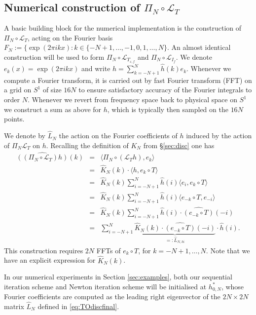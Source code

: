 \documentclass[12pt]{article}
\def\L{\mathcal{L}}
\newcommand{\eps}{\varepsilon}
\theoremstyle{plain}
\begin{document}
{{}



\subsection{Numerical construction of $\Pi_N\circ\L_{T}$}
\label{sec:numLT}
A basic building block for the numerical implementation is the construction of $\Pi_N\circ\L_{T}$, acting on the Fourier basis $F_N:=\{\exp(2\pi i k x): k\in\{-N +1,\ldots,-1,0,1,\ldots,N\}$.
An almost identical construction will be used to form $\Pi_N\circ\L_{T_{\eps,f}}$ and $\Pi_N\circ\L_{I_f}$.
We denote $e_k(x)=\exp(2\pi i k x)$ and write
 $h=\sum_{k=-N+1}^N \hat h(k) e_k$.
Whenever we compute a Fourier transform, it is carried out by fast Fourier transform (FFT) \cite{FFTW} on a grid on $S^1$ of size $16N$ to ensure satisfactory accuracy of the Fourier integrals to order $N$.
Whenever we revert from frequency space back to physical space on $S^1$ we construct a sum as above for $h$, which is typically then sampled on the $16N$ points.

We denote by $\hat L_N$ the action on the Fourier coefficients of $h$ induced by the action of $\Pi_N\L_{T}$ on $h$.
Recalling the definition of $K_N$ from \S\ref{sec:disc} one has
\begin{eqnarray}
\nonumber    \widehat{\left((\Pi_N\circ\L_{T})h\right)}(k) &=& \langle \Pi_N\circ(\L_{T}h), e_k\rangle \\
\nonumber     &=& \hat{K}_N(k)\cdot\langle h, e_k\circ T\rangle\\
  \nonumber   &=&\hat{K}_N(k)\sum_{i=-N+1}^{N} \hat h(i)\langle e_i, e_k\circ T\rangle\\
  \nonumber      &=&\hat{K}_N(k)\sum_{i=-N+1}^{N} \hat h(i)\langle e_{-k}\circ T, e_{-i}\rangle\\
\nonumber   &=&\hat{K}_N(k)\sum_{i=-N+1}^{N} \hat h(i)\cdot \widehat{(e_{-k}\circ T)}(-i)\\
\label{eq:TOdiscfinal}    &=&\sum_{i=-N+1}^{N} \underbrace{\hat{K}_N(k)\cdot \widehat{(e_{-k}\circ T)}(-i)}_{=:\hat L_{N,ki}}\cdot\hat h(i).
\end{eqnarray}
This construction requires $2N$ FFTs of $e_k\circ T$, for $k=-N+1,\ldots,N$.
Note that we have an explicit expression for $\hat{K}_N(k)$.

In our numerical experiments in Section \ref{sec:examples}, both our sequential iteration scheme and Newton iteration scheme will be initialised at $h_{0,N}^*$, whose Fourier coefficients are computed as the leading right eigenvector of the $2N\times 2N$ matrix $\hat{L}_N$ defined in \eqref{eq:TOdiscfinal}.

}
\end{document}
